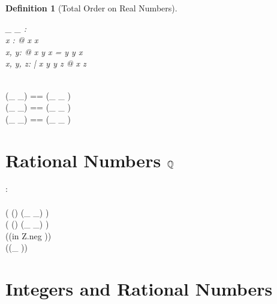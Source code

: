 \documentclass[12pt]{scrartcl}
\newtheorem{zdef}{Definition}[section]
\begin{document}
\begin{zdef}[Total Order on Real Numbers]
  \label{zdef:order-on-reals}
  \begin{axdef}
    \_ \alt \_ : \real \rel \real\\
    \where
    \forall x : \real @ \lnot x \alt x\\
    \forall x, y: \real @ x \alt y \lor x = y \lor y \alt x\\
    \forall x, y, z: \real | x \alt y \land y \alt z @ x \alt z \\
    \azero \alt \aone\\
  \end{axdef}
\end{zdef}

\begin{zed}
  (\_ \aleq \_) == (\_ \alt \_ ) \cup \id \real \\
  (\_ \agt \_) == (\_ \alt \_ ) \inv \\
  (\_ \ageq \_) == (\_ \agt \_ ) \cup \id \real \\
\end{zed}

\section{Rational Numbers $\mathbb{Q}$}
\label{sec:rational-numbers}


\begin{axdef}
  \rat : \power \real
  \where
  \azero \in \rat\\
  \aone \in \rat\\
  \ran ( (\rat \cross \rat) \dres (\_ \aplus \_) ) \subset \rat\\
  \ran ( (\rat \cross \rat) \dres (\_ \amult \_) ) \subset \rat\\
  \ran (\rat \dres (\aArithmetic in Z.neg ))  \subset \rat\\
  \ran (\rat \dres (\_ \ainv ))  \subset \rat\\
\end{axdef}

\section{Integers and Rational Numbers}
\label{sec:integers-and-rationals}

\end{document}
